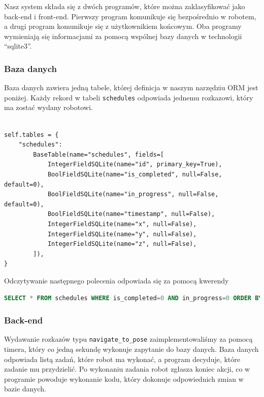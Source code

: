 \documentclass[12pt]{article}
\newcommand{\vsp}{\vspace{0.5cm}}
\begin{document}
\vsp 
Nasz system składa się z dwóch programów, które można zaklasyfikować jako back-end i front-end. Pierwszy program komunikuje się bezpośrednio w robotem, a drugi program komunikuje się z użytkownikiem końcowym. Oba programy wymieniają się informacjami za pomocą wspólnej bazy danych w technologii ``sqlite3''. 

\vsp
\subsubsection*{Baza danych}

\noindent Baza danych zawiera jedną tabele, której definicja w naszym narzędziu ORM jest poniżej. Każdy rekord w tabeli \texttt{schedules} odpowiada jednemu rozkazowi, który ma zostać wydany robotowi.

\vsp\vsp

\begin{lstlisting}

self.tables = {
    "schedules":
        BaseTable(name="schedules", fields=[
            IntegerFieldSQLite(name="id", primary_key=True),
            BoolFieldSQLite(name="is_completed", null=False, default=0),
            BoolFieldSQLite(name="in_progress", null=False, default=0),
            BoolFieldSQLite(name="timestamp", null=False),
            IntegerFieldSQLite(name="x", null=False),
            IntegerFieldSQLite(name="y", null=False),
            IntegerFieldSQLite(name="z", null=False),
        ]),
}

\end{lstlisting}

\vsp
\vsp

\noindent Odczytywanie następnego polecenia odpowiada się za pomocą kwerendy

\vsp 

\begin{lstlisting}[language=SQL]
SELECT * FROM schedules WHERE is_completed=0 AND in_progress=0 ORDER BY timestamp
\end{lstlisting}



\newpage
\subsubsection*{Back-end}

Wydawanie rozkazów typu \texttt{navigate\_to\_pose} zaimplementowaliśmy za pomocą timera, który co jedną sekundę wykonuje zapytanie do bazy danych. Baza danych odpowiada listą zadań, które robot ma wykonać, a program decyduje, które zadanie mu przydzielić. Po wykonaniu zadania robot zgłasza koniec akcji, co w programie powoduje wykonanie kodu, który dokonuje odpowiednich zmian w bazie danych.
\end{document}
